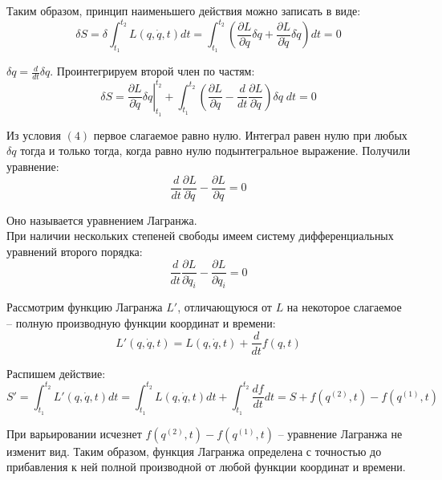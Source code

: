 \documentclass{article}
\begin{document}
	Таким образом, принцип наименьшего действия можно записать в виде:
	\begin{equation}
		\delta S = \delta \int_{t_1}^{t_2} L(q,\dot q,t)dt = \int_{t_1}^{t_2}(\frac{\partial L}{\partial q}\delta q + \frac{\partial L}{\partial\dot q}\delta\dot q)dt = 0
	\end{equation}

	$\delta q = \frac{d}{dt}\delta q$. Проинтегрируем второй член по частям:
	\begin{equation}
		\delta S = \left. \frac{\partial L}{\partial\dot q}\delta q \right|_{t_1}^{t_2} + \int_{t_1}^{t_2}(\frac{\partial L}{\partial q}-\frac{d}{dt}\frac{\partial L}{\partial\dot q})\delta q\;dt = 0
	\end{equation}

	Из условия $(4)$ первое слагаемое равно нулю. Интеграл равен нулю при любых $\delta q$ тогда и только тогда, когда равно нулю подынтегральное выражение. Получили уравнение:
	\begin{equation}
		\frac{d}{dt}\frac{\partial L}{\partial\dot q} - \frac{\partial L}{\partial q} = 0
	\end{equation}

	Оно называется уравнением Лагранжа.\\

	При наличии нескольких степеней свободы имеем систему дифференциальных уравнений второго порядка:
	\begin{equation}
		\frac{d}{dt}\frac{\partial L}{\partial\dot q_i} - \frac{\partial L}{\partial q_i} = 0		
	\end{equation}

	Рассмотрим функцию Лагранжа $L'$, отличающуюся от $L$ на некоторое слагаемое -- полную производную функции координат и времени:
	\begin{equation}
		L'(q,\dot q,t) = L(q,\dot q, t)+\frac{d}{dt}f(q,t)
	\end{equation}

	Распишем действие:
	\begin{equation}
		S'= \int_{t_1}^{t_2} L'(q,\dot q,t)dt = \int_{t_1}^{t_2} L(q,\dot q, t)dt + \int_{t_1}^{t_2}\frac{df}{dt}dt = S + f(q^{(2)},t)-f(q^{(1)},t)
	\end{equation}

	При варьировании исчезнет $f(q^{(2)},t)-f(q^{(1)},t)$ -- уравнение Лагранжа не изменит вид. Таким образом, функция Лагранжа определена с точностью до прибавления к ней полной производной от любой функции координат и времени.
\end{document}
